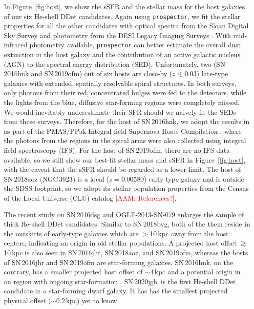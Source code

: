 \documentclass[twocolumn]{aastex631}
\newcommand{\sn}{SN\,2020jgb}
\newcommand{\adam}[1]{\textcolor{red}{[AAM: #1]}}
\begin{document}
In Figure~\ref{fig:host}, we show the sSFR and the stellar mass for the host galaxies of our six He-shell DDet candidates. Again using \texttt{prospector}, we fit the stellar properties for all the other candidates with optical spectra from the Sloan Digital Sky Survey \citep[SDSS;][]{York_2000} and photometry from the DESI Legacy Imaging Surveys \citep[][{\it g, r, z, $W_1$, $W_2$, $W_3$, $W_4$} magnitudes]{Dey_2019}. With mid-infrared photometry available, \texttt{prospector} can better estimate the overall dust extinction in the host galaxy and the contribution of an active galactic nucleus (AGN) to the spectral energy distribution (SED). Unfortunately, two (SN\,2016hnk and SN\,2019ofm) out of six hosts are close-by ($z\lesssim 0.03$) late-type galaxies with extended, spatially resolvable spiral structures. In both surveys, only photons from their red, concentrated bulges were fed to the detectors, while the lights from the blue, diffusive star-forming regions were completely missed. We would inevitably underestimate their SFR should we naively fit the SEDs from these surveys. Therefore, for the host of SN\,2016hnk, we adopt the results in \citet{galbany_16hnk_2019} as part of the PMAS/PPak Integral-field Supernova Hosts Compilation \citep[PISCO;][]{Galbany_PISCO_2018}, where the photons from the  regions in the spiral arms were also collected using integral field spectroscopy (IFS). For the host of SN\,2019ofm, there are no IFS data available, so we still show our best-fit stellar mass and sSFR in Figure~\ref{fig:host}, with the caveat that the sSFR should be regarded as a lower limit. The host of SN\,2018aoz (NGC\,3923) is a local ($z=0.00580$) early-type galaxy and is outside the SDSS footprint, so we adopt its stellar population properties from the Census of the Local Universe (CLU) catalog \adam{References?}.

The recent study on SN\,2016dsg and OGLE-2013-SN-079 \citep{Dong_16dsg_2022} enlarges the sample of thick He-shell DDet candidates. Similar to SN\,2018byg, both of the them reside in the outskirts of early-type galaxies which are $>$10\,kpc away from the host centers, indicating an origin in old stellar populations. A projected host offset $\gtrsim$10\,kpc is also seen in SN\,2016jhr, SN\,2018aoz, and SN\,2019ofm, whereas the hosts of SN\,2016jhr and SN\,2019ofm are star-forming galaxies. SN\,2016hnk, on the contrary, has a smaller projected host offset of $\sim$4\,kpc and a potential origin in an  region with ongoing star-formation \citep{galbany_16hnk_2019}. \sn\ is the first He-shell DDet candidate in a star-forming dwarf galaxy. It has has the smallest projected physical offset ($\sim$0.2\,kpc) yet to know.
\end{document}
